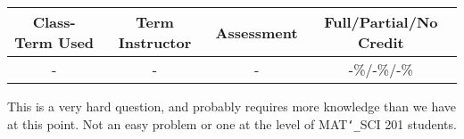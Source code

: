 \begin{outcomes}
\begin{center}
	\begin{tabular}{cccc}
		\hline\hline
		Class-Term Used & Term Instructor & Assessment & Full/Partial/No Credit \\
		\hline
		- & - & - & -\%/-\%/-\%\\    %
		\hline
	\end{tabular}
\end{center}
\end{outcomes}

\begin{comments}

This is a very hard question, and probably requires more knowledge than we have at this point. Not an easy problem or one at the level of MAT\texttt{\char`_}SCI 201 students. 

\end{comments}